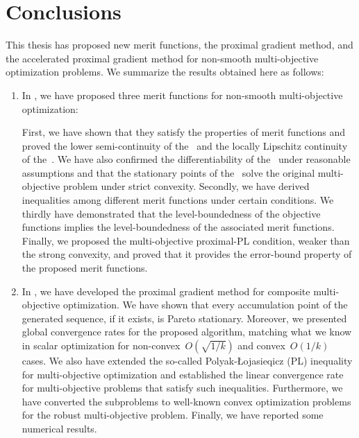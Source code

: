 \documentclass[../main]{subfiles}
\begin{document}
\chapter{Conclusions} 
This thesis has proposed new merit functions, the proximal gradient method, and the accelerated proximal gradient method for non-smooth multi-objective optimization problems.
We summarize the results obtained here as follows:
\begin{enumerate}
    \item In , we have proposed three merit functions for non-smooth multi-objective optimization:
          First, we have shown that they satisfy the properties of merit functions and proved the lower semi-continuity of the~ and the locally Lipschitz continuity of the~.
          We have also confirmed the differentiability of the~ under reasonable assumptions and that the stationary points of the~ solve the original multi-objective problem under strict convexity.
          Secondly, we have derived inequalities among different merit functions under certain conditions.
          We thirdly have demonstrated that the level-boundedness of the objective functions implies the level-boundedness of the associated merit functions.
          Finally, we proposed the multi-objective proximal-PL condition, weaker than the strong convexity, and proved that it provides the error-bound property of the proposed merit functions.

    \item In , we have developed the proximal gradient method for composite multi-objective optimization.
          We have shown that every accumulation point of the generated sequence, if it exists, is Pareto stationary.
          Moreover, we presented global convergence rates for the proposed algorithm, matching what we know in scalar optimization for non-convex~$O(\sqrt{1 / k})$ and convex~$O(1 / k)$ cases.
          We also have extended the so-called Polyak-{\L}ojasieqicz (PL) inequality for multi-objective optimization and established the linear convergence rate for multi-objective problems that satisfy such inequalities.
          Furthermore, we have converted the subproblems to well-known convex optimization problems for the robust multi-objective problem.
          Finally, we have reported some numerical results.


\end{enumerate}
\end{document}
